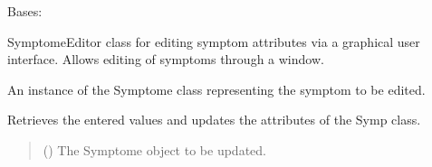 \documentclass[letterpaper,10pt,english]{sphinxmanual}
\begin{document}
\begin{fulllineitems}
\label{\detokenize{annotation:annotation.pop_up.SymptomeEditor}}
\pysigstartsignatures
{}
\pysigstopsignatures
\sphinxAtStartPar
Bases: 

\sphinxAtStartPar
SymptomeEditor class for editing symptom attributes via a graphical user interface.
Allows editing of symptoms through a window.

\begin{fulllineitems}
\label{\detokenize{annotation:annotation.pop_up.SymptomeEditor.Symp}}
\pysigstartsignatures
{}
\pysigstopsignatures
\sphinxAtStartPar
An instance of the Symptome class representing the symptom to be edited.
\begin{quote}\begin{description}
\sphinxAtStartPar
{}

\end{description}\end{quote}

\end{fulllineitems}


\begin{fulllineitems}
\label{\detokenize{annotation:annotation.pop_up.SymptomeEditor.apply_changes}}
\pysigstartsignatures
{}
\pysigstopsignatures
\sphinxAtStartPar
Retrieves the entered values and updates the attributes of the Symp class.
\begin{quote}\begin{description}
\sphinxAtStartPar
{} () \textendash{} The Symptome object to be updated.

\end{description}\end{quote}


\end{fulllineitems}
\end{fulllineitems}
\end{document}
